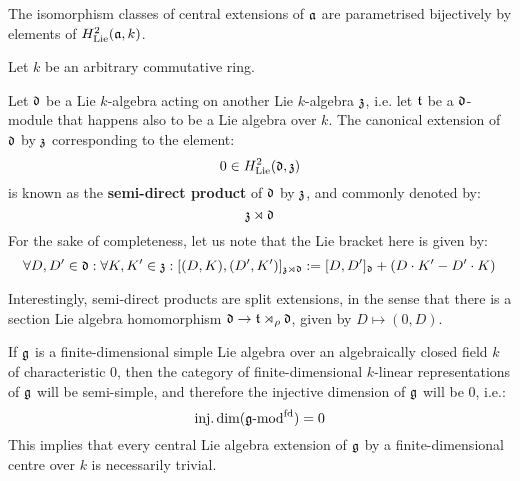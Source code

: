         \begin{corollary}[Trivial cohomological coefficients = central extensions]
            The isomorphism classes of central extensions of $\mathfrak{a}$ are parametrised bijectively by elements of $H^2_{\mathrm{Lie}}(\mathfrak{a}, k)$.
        \end{corollary}
        \begin{example}
            Let $k$ be an arbitrary commutative ring. 
            
            Let $\mathfrak{d}$ be a Lie $k$-algebra acting on another Lie $k$-algebra $\mathfrak{z}$, i.e. let $\mathfrak{t}$ be a $\mathfrak{d}$-module that happens also to be a Lie algebra over $k$. The canonical extension of $\mathfrak{d}$ by $\mathfrak{z}$ corresponding to the element:
                $$0 \in H^2_{\mathrm{Lie}}(\mathfrak{d}, \mathfrak{z})$$
            is known as the \textbf{semi-direct product} of $\mathfrak{d}$ by $\mathfrak{z}$, and commonly denoted by:
                $$\mathfrak{z} \rtimes \mathfrak{d}$$
            For the sake of completeness, let us note that the Lie bracket here is given by:
                $$\forall D, D' \in \mathfrak{d}: \forall K, K' \in \mathfrak{z}: [ (D, K), (D', K') ]_{\mathfrak{z} \rtimes \mathfrak{d}} := [D, D']_{\mathfrak{d}} + ( D \cdot K' - D' \cdot K )$$
            
            Interestingly, semi-direct products are split extensions, in the sense that there is a section Lie algebra homomorphism $\mathfrak{d} \to \mathfrak{t} \rtimes_{\rho} \mathfrak{d}$, given by $D \mapsto (0, D)$.
        \end{example}
        \begin{example}
            If $\mathfrak{g}$ is a finite-dimensional simple Lie algebra over an algebraically closed field $k$ of characteristic $0$, then the category of finite-dimensional $k$-linear representations of $\mathfrak{g}$ will be semi-simple, and therefore the injective dimension of $\mathfrak{g}$ will be $0$, i.e.:
                $$\operatorname{inj.dim}(\mathfrak{g}\text{-}\mathrm{mod}^{\mathrm{fd}}) = 0$$
            This implies that every central Lie algebra extension of $\mathfrak{g}$ by a finite-dimensional centre over $k$ is necessarily trivial. 
        \end{example}

